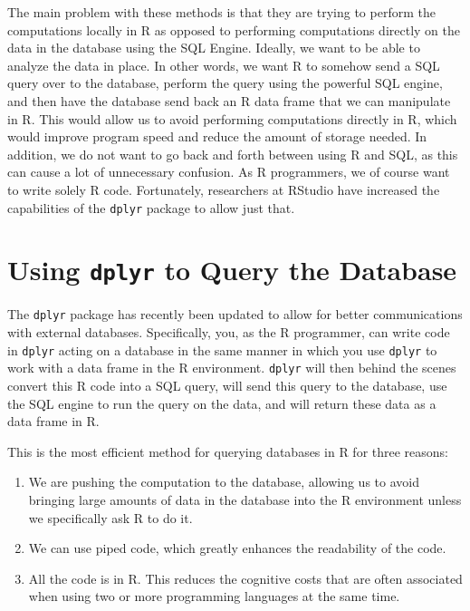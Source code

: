 \documentclass[]{krantz}
\providecommand{\tightlist}{%
  \setlength{\itemsep}{0pt}\setlength{\parskip}{0pt}}
\begin{document}
The main problem with these methods is that they are trying to perform the computations locally in R as opposed to performing computations directly on the data in the database using the SQL Engine. Ideally, we want to be able to analyze the data in place. In other words, we want R to somehow send a SQL query over to the database, perform the query using the powerful SQL engine, and then have the database send back an R data frame that we can manipulate in R. This would allow us to avoid performing computations directly in R, which would improve program speed and reduce the amount of storage needed. In addition, we do not want to go back and forth between using R and SQL, as this can cause a lot of unnecessary confusion. As R programmers, we of course want to write solely R code. Fortunately, researchers at RStudio have increased the capabilities of the \texttt{dplyr} package to allow just that.

\hypertarget{using-dplyr-to-query-the-database}{%
\section{\texorpdfstring{Using \texttt{dplyr} to Query the Database}{Using dplyr to Query the Database}}\label{using-dplyr-to-query-the-database}}

The \texttt{dplyr} package has recently been updated to allow for better communications with external databases. Specifically, you, as the R programmer, can write code in \texttt{dplyr} acting on a database in the same manner in which you use \texttt{dplyr} to work with a data frame in the R environment. \texttt{dplyr} will then behind the scenes convert this R code into a SQL query, will send this query to the database, use the SQL engine to run the query on the data, and will return these data as a data frame in R.

This is the most efficient method for querying databases in R for three reasons:

\begin{enumerate}
\def\labelenumi{\arabic{enumi}.}
\tightlist
\item
  We are pushing the computation to the database, allowing us to avoid bringing large amounts of data in the database into the R environment unless we specifically ask R to do it.
\item
  We can use piped code, which greatly enhances the readability of the code.
\item
  All the code is in R. This reduces the cognitive costs that are often associated when using two or more programming languages at the same time.
\end{enumerate}
\end{document}
